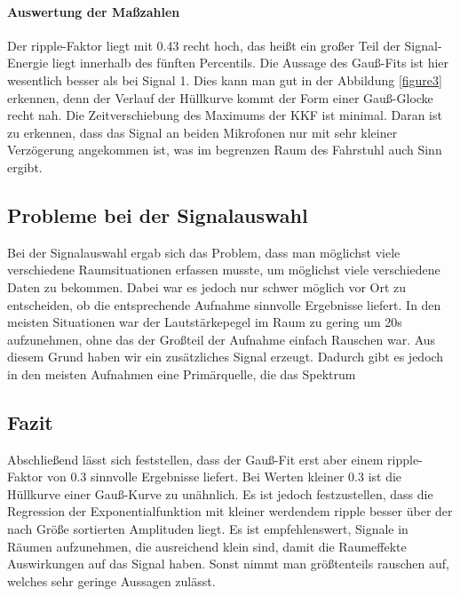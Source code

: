 \paragraph{Auswertung der Maßzahlen}
Der ripple-Faktor liegt mit 0.43 recht hoch, das heißt ein großer Teil der Signal-Energie liegt innerhalb des fünften Percentils. Die Aussage des Gauß-Fits ist hier wesentlich besser als bei Signal 1. Dies kann man gut in der Abbildung \ref{figure3} erkennen, denn der Verlauf der Hüllkurve kommt der Form einer Gauß-Glocke recht nah. Die Zeitverschiebung des Maximums der KKF ist minimal. Daran ist zu erkennen, dass das Signal an beiden Mikrofonen nur mit sehr kleiner Verzögerung angekommen ist, was im begrenzen Raum des Fahrstuhl auch Sinn ergibt.

\subsection{Probleme bei der Signalauswahl}
Bei der Signalauswahl ergab sich das Problem, dass man möglichst viele verschiedene Raumsituationen erfassen musste, um möglichst viele verschiedene Daten zu bekommen. Dabei war es jedoch nur schwer möglich vor Ort zu entscheiden, ob die entsprechende Aufnahme sinnvolle Ergebnisse liefert.
In den meisten Situationen war der Lautstärkepegel im Raum zu gering um 20s aufzunehmen, ohne das der Großteil der Aufnahme einfach Rauschen war. Aus diesem Grund haben wir ein zusätzliches Signal erzeugt. Dadurch gibt es jedoch in den meisten Aufnahmen eine Primärquelle, die das Spektrum 

\subsection{Fazit}
Abschließend lässt sich feststellen, dass der Gauß-Fit erst aber einem ripple-Faktor von 0.3 sinnvolle Ergebnisse liefert. Bei Werten kleiner 0.3 ist die Hüllkurve einer Gauß-Kurve zu unähnlich. Es ist jedoch festzustellen, dass die Regression der Exponentialfunktion mit kleiner werdendem ripple besser über der nach Größe sortierten Amplituden liegt.
Es ist empfehlenswert, Signale in Räumen aufzunehmen, die ausreichend klein sind, damit die Raumeffekte Auswirkungen auf das Signal haben. Sonst nimmt man größtenteils rauschen auf, welches sehr geringe Aussagen zulässt.
